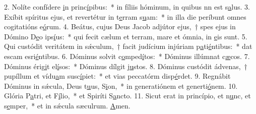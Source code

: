 2. Nolíte confídere \uline{i}n princ\uline{í}pibus:~* in fíliis hóminum, in quibus nn est s\uline{a}lus.
3. Exíbit spíritus ejus, et revertétur in t\uline{e}rram s\uline{u}am:~* in illa die períbunt omnes cogitatións e\uline{ó}rum.
4. Beátus, cujus Deus Jacob adjútor ejus,~† spes ejus in Dómino D\uline{e}o ips\uline{í}us:~* qui fecit cælum et terram, mare et ómnia,  in \uline{e}is sunt.
5. Qui custódit veritátem in sǽculum,~† facit judícium injúriam p\uline{a}ti\uline{é}ntibus:~* dat escam esri\uline{é}ntibus.
6. Dóminus solvit c\uline{o}mped\uline{í}tos:~* Dóminus illúmnat c\uline{æ}cos.
7. Dóminus érig\uline{i}t el\uline{í}sos:~* Dóminus dílgit j\uline{u}stos.
8. Dóminus custódit ádvenas,~† pupíllum et vídu\uline{a}m susc\uline{í}piet:~* et vias peccatórm disp\uline{é}rdet.
9. Regnábit Dóminus in sǽcula, Deus t\uline{u}us, S\uline{i}on,~* in generatiónem et generti\uline{ó}nem.
10. Glória P\uline{a}tri, et F\uline{í}lio,~* et Spiríti S\uline{a}ncto.
11. Sicut erat in princípio, et n\uline{u}nc, et s\uline{e}mper,~* et in sǽcula sæculrum. \uline{A}men.
